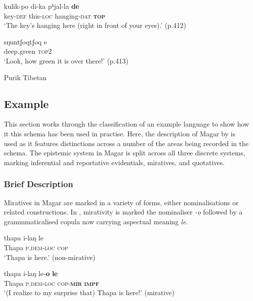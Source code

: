 \begin{exe}
  \ex \label{e:Methods:PurikDem}
  \begin{xlist}
    \ex 
    \gll kulik-po di-ka pʰjal-la \textbf{de} \\
    key-\textsc{def} this-\textsc{loc} hanging-\textsc{dat} \textsc{\textbf{top}} \\
    \glt `The key’s hanging here (right in front of your eyes).' (p.412)

    \ex
    \gll sŋuntʃoqtʃoq e \\
    deep.green \textsc{top2} \\
    \glt `Look, how green it is over there!' (p.413)
  \end{xlist}
  Purik Tibetan \cite[Tibetic:India][]{Zemp2021}
\end{exe}

\subsection{Example}\label{ss:Methods:MagarExample}
This section works through the classification of an example language to show how it this schema has been used in practise. Here, the description of Magar by  is used as it features distinctions across a number of the areas being recorded in the schema. The epistemic system in Magar is split across all three discrete systems, marking inferential and reportative evidentials, miratives, and quotatives.

\subsubsection{Brief Description}
Miratives in Magar are marked in a variety of forms, either nominalisations or related constructions. In , mirativity is marked the nominaliser \textit{-o} followed by a grammmaticalised copula now carrying aspectual meaning \textit{le}. 

\begin{exe}
  \ex\label{e:Methods:MagarMirativeIntro}
  \begin{xlist}
    \ex
    \gll thapa i-laŋ le \\
    Thapa \textsc{p.dem-loc} \textsc{cop} \\
    \glt `Thapa is here.' (non-mirative)

    \ex 
    \gll thapa i-laŋ le-\textbf{o} \textbf{le} \\
    Thapa \textsc{p.dem-loc} \textsc{cop-\textbf{mir}} \textsc{\textbf{impf}} \\
    \glt `(I realize to my surprise that) Thapa is here!' (mirative)
  \end{xlist}
  \cite[Magar,][480]{GrunowHarsta2008}
\end{exe}

